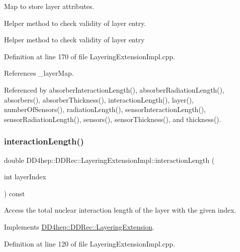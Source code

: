 Map to store layer attributes. 

Helper method to check validity of layer entry.

Helper method to check validity of layer entry 

Definition at line 170 of file Layering\+Extension\+Impl.\+cpp.



References \+\_\+layer\+Map.



Referenced by absorber\+Interaction\+Length(), absorber\+Radiation\+Length(), absorbers(), absorber\+Thickness(), interaction\+Length(), layer(), number\+Of\+Sensors(), radiation\+Length(), sensor\+Interaction\+Length(), sensor\+Radiation\+Length(), sensors(), sensor\+Thickness(), and thickness().

\hypertarget{class_d_d4hep_1_1_d_d_rec_1_1_layering_extension_impl_a7aae4201942d846015d5defa357e2e9d}{}\label{class_d_d4hep_1_1_d_d_rec_1_1_layering_extension_impl_a7aae4201942d846015d5defa357e2e9d} 
\subsubsection{\texorpdfstring{interaction\+Length()}{interactionLength()}}
{\footnotesize\ttfamily double D\+D4hep\+::\+D\+D\+Rec\+::\+Layering\+Extension\+Impl\+::interaction\+Length (\begin{DoxyParamCaption}\item[{int}]{layer\+Index }\end{DoxyParamCaption}) const\hspace{0.3cm}{\ttfamily [virtual]}}



Access the total nuclear interaction length of the layer with the given index. 



Implements \hyperlink{class_d_d4hep_1_1_d_d_rec_1_1_layering_extension_aa7959c9c384c0f5ffcd066c5dc01514f}{D\+D4hep\+::\+D\+D\+Rec\+::\+Layering\+Extension}.



Definition at line 120 of file Layering\+Extension\+Impl.\+cpp.



